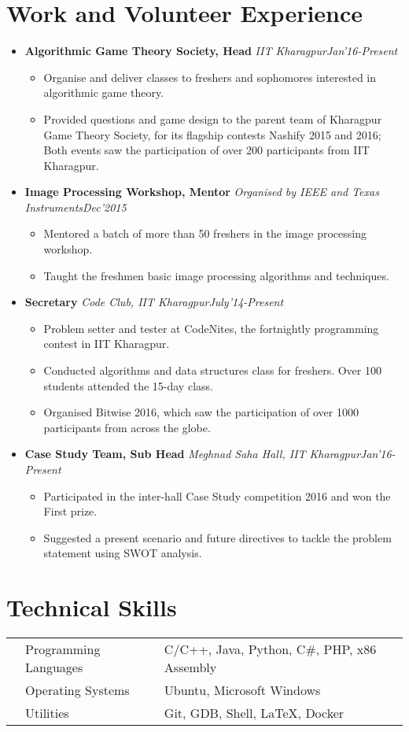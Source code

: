 \documentclass[11pt,a4paper]{moderncv}
\newcommand{\experience}[4]{
  \vspace{0.1cm}
\item \textbf{\large{#1}} \textit{#2}\hfill\textit{#3}
  \begin{itemize}[leftmargin=*]
    \setlength\itemsep{0em} #4
  \end{itemize}
}
\begin{document}
\section*{Work and Volunteer Experience}
\begin{itemize}
  \setlength\itemsep{0.5em}

  \experience{Algorithmic Game Theory Society, Head}{IIT Kharagpur}{Jan'16-Present}{
  \item	Organise and deliver classes to freshers and sophomores interested in algorithmic game theory. 
  \item	Provided questions and game design to the parent team of Kharagpur Game Theory Society, for its flagship contests Nashify 2015 and 2016; Both events saw the participation of over 200 participants from IIT Kharagpur.
  }
    
  \experience{Image Processing Workshop, Mentor}{Organised by IEEE and Texas Instruments}{Dec'2015}{
  \item Mentored a batch of more than 50 freshers in the image processing workshop.
  \item Taught the freshmen basic image processing algorithms and techniques.
  }

  \experience{Secretary}{Code Club, IIT Kharagpur}{July'14-Present}{
  \item	Problem setter and tester at CodeNites, the fortnightly programming contest in IIT Kharagpur.
  \item	Conducted algorithms and data structures class for freshers. Over 100 students attended the 15-day class.
  \item Organised Bitwise 2016, which saw the participation of over 1000 participants from across the globe.
  }

  \experience{Case Study Team, Sub Head}{Meghnad Saha Hall, IIT Kharagpur}{Jan'16-Present}{
  \item Participated in the inter-hall Case Study competition 2016 and won the First prize.
  \item Suggested a present scenario and future directives to tackle the problem statement using SWOT analysis.
  }

\end{itemize}

\section*{Technical Skills}
\begin{tabular}{L{0.05cm} L{5cm} l}
  &Programming Languages      &C/C++, Java, Python, C\#, PHP, x86 Assembly\\
  &Operating Systems	        &Ubuntu, Microsoft Windows\\
  &Utilities                  &Git, GDB, Shell, \LaTeX, Docker\\
\end{tabular}
\end{document}
